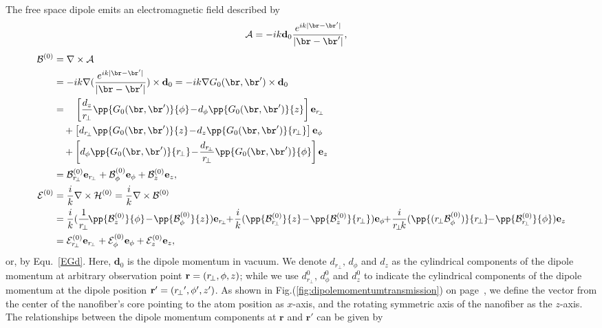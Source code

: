 \documentclass[]{report}
\begin{document}
The free space dipole emits an electromagnetic field described by
\begin{align}
\mathcal{A} &= -ik \mathbf{d}_0 \frac{e^{ik|\br-\br'|}}{|\br-\br'|},
\end{align}
\begin{align}
\mathcal{B}^{(0)} &= \nabla\times \mathcal{A}\nonumber \\
&=-ik\nabla(\frac{e^{ik|\br-\br'|}}{|\br-\br'|})\times\mathbf{d}_0=-ik\nabla G_0(\br,\br')\times\mathbf{d}_0\nonumber\\
&=\quad\left[\frac{d_z}{r\!_\perp}\pp{G_0(\br,\br')}{\phi}\!-\! d_\phi\pp{G_0(\br,\br')}{z}\right]\mathbf{e}_{r\!_{\perp}}\nonumber\\
&\quad+\left[d_{r\!_\perp}\pp{G_0(\br,\br')}{z}\!-\!d_z\pp{G_0(\br,\br')}{r\!_\perp} \right]\mathbf{e}_\phi \nonumber\\
&\quad+ \left[d_\phi\pp{G_0(\br,\br')}{r\!_\perp}\!-\! \frac{d_{r\!_\perp}}{r\!_\perp}\pp{G_0(\br,\br')}{\phi} \right]\mathbf{e}_z\\
&=\mathcal{B}^{(0)}_{r\!_\perp}\mathbf{e}_{r\!_{\perp}} +\mathcal{B}^{(0)}_\phi\mathbf{e}_\phi + \mathcal{B}^{(0)}_z\mathbf{e}_z,\\
\mathcal{E}^{(0)} &= \frac{i}{k} \nabla\times \mathcal{H}^{(0)}=\frac{i}{k}\nabla\times \mathcal{B}^{(0)}\nonumber\\
&=\frac{i}{k}(\frac{1}{r\!_\perp}\!\pp{\mathcal{B}^{(0)}_z}{\phi}\!-\! \pp{\mathcal{B}^{(0)}_\phi}{z})\mathbf{e}_{r\!_{\perp}} \!\!+\! \frac{i}{k}(\pp{\mathcal{B}^{(0)}_{r\!_\perp}}{z} \!-\! \pp{\mathcal{B}^{(0)}_z}{r\!_\perp})\mathbf{e}_\phi \!\!+\! \frac{i}{r\!_\perp\! k}(\pp{(r\!_\perp \mathcal{B}^{(0)}_\phi)}{r\!_\perp} \!\!-\! \pp{\mathcal{B}^{(0)}_{r\!_\perp}}{\phi})\mathbf{e}_z\\
&=\mathcal{E}^{(0)}_{r\!_\perp}\mathbf{e}_{r\!_{\perp}} +\mathcal{E}^{(0)}_\phi\mathbf{e}_\phi + \mathcal{E}^{(0)}_z\mathbf{e}_z,
\end{align}
or, by Equ.~\eqref{EGd}. Here, $ \mathbf{d}_0 $ is the dipole momentum in vacuum. We denote $d_{r\!_\perp},\, d_\phi$ and $d_z$ as the cylindrical components of the dipole momentum at arbitrary observation point ${\rm {\bf r}}=\left( {r\!_\perp ,\phi ,z}\right) $; while we use $d^0_{r\!_\perp}$, $d^0_\phi$ and $d^0_z$ to indicate the cylindrical components of the dipole momentum at the dipole position ${\rm 
{\bf {r}^{\prime }}}=\left( {{r\!_\perp }^{\prime },{\phi }^{\prime },{z}^{\prime }}\right) $. As shown in Fig.(\ref{fig:dipolemomentumtransmission}) on page~\pageref{fig:dipolemomentumtransmission}, we define the vector from the center of the nanofiber's core pointing to the atom position as $x$-axis, and the rotating symmetric axis of the nanofiber as the $z$-axis. The relationships between the dipole momentum components at $\mathbf{r}$ and $\mathbf{r}'$ can be given by
\end{document}
